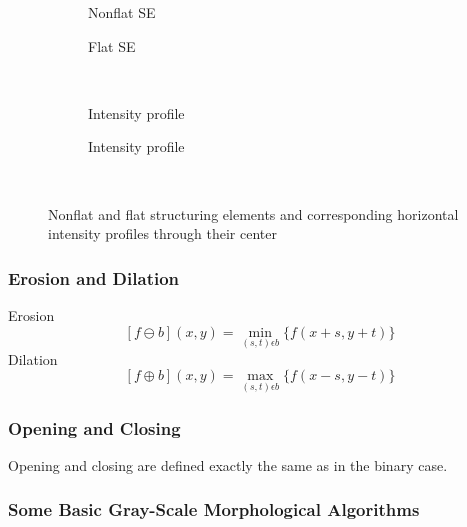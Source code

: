 \begin{figure}[h!]
\centering
\begin{subfigure}[b]{0.45\textwidth}
\centering
{}
\caption{Nonflat SE}
\end{subfigure}
\begin{subfigure}[b]{0.45\textwidth}
\centering
{}
\caption{Flat SE}
\end{subfigure}\\
\begin{subfigure}[b]{0.45\textwidth}
\centering
{}
\caption{Intensity profile}
\end{subfigure}
\begin{subfigure}[b]{0.45\textwidth}
\centering
{}
\caption{Intensity profile}
\end{subfigure}\\
\caption{Nonflat and flat structuring elements and corresponding horizontal intensity profiles through their center}
\end{figure}
\subsubsection{Erosion and Dilation}
Erosion
\[
	[f\ominus b](x,y) = \min_{(s,t)\epsilon b} \{f(x+s,y+t)\}
\]
Dilation
\[
	[f\oplus b](x,y) = \max_{(s,t)\epsilon b} \{f(x-s,y-t)\}
\]
\subsubsection{Opening and Closing}
Opening and closing are defined exactly the same as in the binary case.
\subsubsection{Some Basic Gray-Scale Morphological Algorithms}

